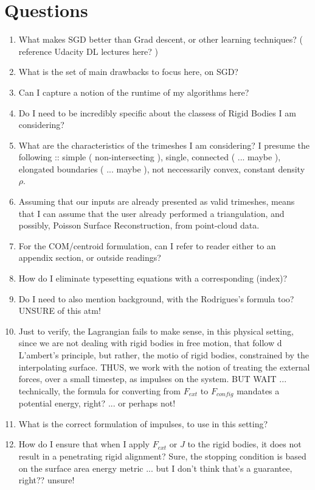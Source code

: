 \documentclass{article}
\begin{document}
\section{Questions}
	\begin{enumerate}
		\item What makes SGD better than Grad descent, or other learning techniques? ( reference Udacity DL lectures here? )
		\item What is the set of main drawbacks to focus here, on SGD? 
		\item Can I capture a notion of the runtime of my algorithms here?  
		\item Do I need to be incredibly specific about the classess of Rigid Bodies I am considering? 
		\item What are the characteristics of the trimeshes I am considering? I presume the following :: simple ( non-intersecting ), single, connected ( ... maybe ), elongated boundaries ( ... maybe ), not neccessarily convex, constant density $\rho$.  
		\item Assuming that our inputs are already presented as valid trimeshes, means that I can assume that the user already performed a triangulation, and possibly, Poisson Surface Reconstruction, from point-cloud data.
		\item For the COM/centroid formulation, can I refer to reader either to an appendix section, or outside readings? 
		\item How do I eliminate typesetting equations with a corresponding (index)?
		\item Do I need to also mention background, with the Rodrigues's formula too? UNSURE of this atm!
		\item Just to verify, the Lagrangian fails to make sense, in this physical setting, since we are not dealing with rigid bodies in free motion, that follow d L'ambert's principle, but rather, the motio of rigid bodies, constrained by the interpolating surface. THUS, we work with the notion of treating the external forces, over a small timestep, as impulses on the system. BUT WAIT ... technically, the formula for converting from $F_{ext}$ to $F_{config}$ mandates a potential energy, right? ... or perhaps not!
		\item What is the correct formulation of impulses, to use in this setting?
		\item How do I ensure that when I apply $F_{ext}$ or $J$ to the rigid bodies, it does not result in a penetrating rigid alignment? Sure, the stopping condition is based on the surface area energy metric ... but I don't think that's a guarantee, right?? unsure!
	\end{enumerate}

\end{document}
